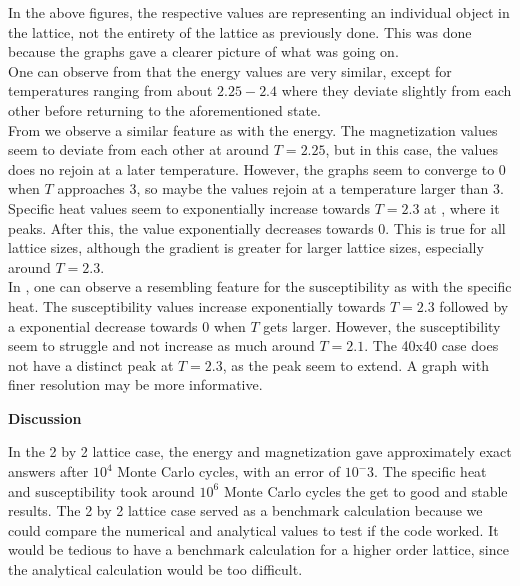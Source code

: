 \documentclass[10pt,a4paper]{article}
\begin{document}
\noindent In the above figures, the respective values are representing an individual object in the lattice, not the entirety of the lattice as previously done. This was done because the graphs gave a clearer picture of what was going on.\\

\noindent One can observe from  that the energy values are very similar, except for temperatures ranging from about $2.25 - 2.4$ where they deviate slightly from each other before returning to the aforementioned state.\\

\noindent From  we observe a similar feature as with the energy. The magnetization values seem to deviate from each other at around $T = 2.25$, but in this case, the values does no rejoin at a later temperature. However, the graphs seem to converge to $0$ when $T$ approaches $3$, so maybe the values rejoin at a temperature larger than $3$.\\

\noindent Specific heat values seem to exponentially increase towards $T = 2.3$ at , where it peaks. After this, the value exponentially decreases towards $0$. This is true for all lattice sizes, although the gradient is greater for larger lattice sizes, especially around $T = 2.3$.\\

\noindent In , one can observe a resembling feature for the susceptibility as with the specific heat. The susceptibility values increase exponentially towards $T = 2.3$ followed by a exponential decrease towards $0$ when $T$ gets larger. However, the susceptibility seem to struggle and not increase as much around $T = 2.1$. The 40x40 case does not have a distinct peak at $T = 2.3$, as the peak seem to extend. A graph with finer resolution may be more informative. 

\newpage

\begin{center}
{\LARGE\bf Discussion}
\end{center}

\noindent In the 2 by 2 lattice case, the energy and magnetization gave approximately exact answers after $10^4$ Monte Carlo cycles, with an error of $10^-3$. The specific heat and susceptibility took around $10^6$ Monte Carlo cycles the get to good and stable results. The 2 by 2 lattice case served as a benchmark calculation because we could compare the numerical and analytical values to test if the code worked. It would be tedious to have a benchmark calculation for a higher order lattice, since the analytical calculation would be too difficult.\\
\end{document}
